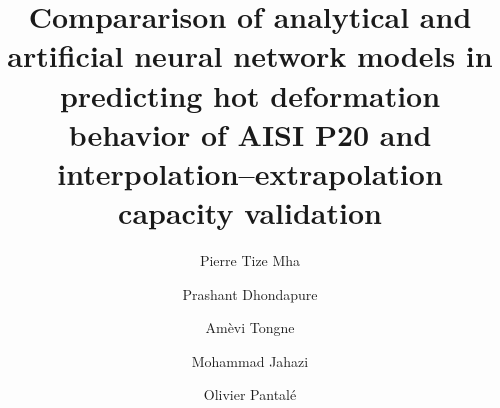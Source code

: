 \documentclass[twoside,english,1p,final,sort&compress]{elsarticle}
\theoremstyle{plain}
\begin{document}
\begin{frontmatter}

\title{Compararison of analytical and artificial neural network models in predicting hot deformation behavior of AISI P20 and  interpolation--extrapolation capacity validation}

\author[LGP]{Pierre Tize Mha}
\author[ETS]{Prashant Dhondapure}
\author[LGP]{Amèvi Tongne}
\author[ETS]{Mohammad Jahazi}
\author[LGP]{Olivier Pantalé }


\address[LGP]{Laboratoire Génie de Production, INP/ENIT, Université de Toulouse, 47 Av d'Azereix, Tarbes, France 65016}
\address[ETS]{Écolde de Technologie Supérieure, 1100 Rue Notre Dame O, Montréal, QC H3C 1K3}


\end{frontmatter}
\end{document}
